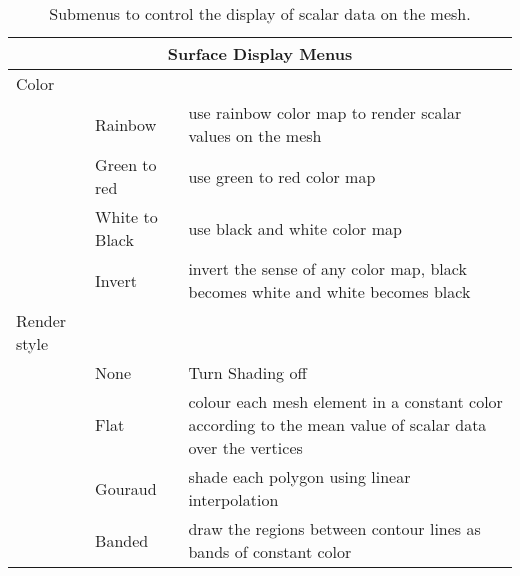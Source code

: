 \begin{table}[ht]
  \begin{center}
    \begin{tabular}{|l|l|p{2.5 in}|} \hline
      \multicolumn{3}{|c|}{\textbf{Surface Display Menus}} \\ \hline \hline
    Color & & \\
    &  Rainbow  & use rainbow color map to render scalar values on the mesh\\
    &  Green to red & use green to red color map\\
    &  White to Black & use black and white color map\\ 
    &  Invert & invert the sense of any color map, \eg{} black becomes
        white and white becomes black \\ \hline
    Render style & & \\
    &  None & Turn Shading off \\
    &  Flat & colour each mesh element in a constant
       color according to the mean value of scalar data over the vertices\\
    &  Gouraud & shade each polygon using linear interpolation \\
    &  Banded & draw the regions between contour lines as bands of constant
       color\\  \hline
    \end{tabular}
  \end{center}
\caption{Submenus to control the display of scalar data on the mesh.}
\end{table}


